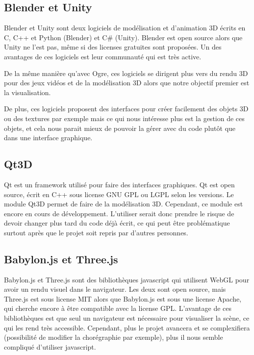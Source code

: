


\subsection{Blender et Unity}

Blender et Unity sont deux logiciels de modélisation et d'animation 3D écrits en C, C++ et Python (Blender) et C\# (Unity). Blender est open source alors que Unity ne l'est pas, même si des licenses gratuites sont proposées. Un des avantages de ces logiciels est leur communauté qui est très active.

De la même manière qu'avec Ogre, ces logiciels se dirigent plus vers du rendu 3D pour des jeux vidéos et de la modélisation 3D alors que notre objectif premier est la visualisation. 

De plus, ces logiciels proposent des interfaces pour créer facilement des objets 3D ou des textures par exemple mais ce qui nous intéresse plus est la gestion de ces objets, et cela nous parait mieux de pouvoir la gérer avec du code plutôt que dans une interface graphique. 
				
\subsection{Qt3D}

Qt est un framework utilisé pour faire des interfaces graphiques. Qt est open source, écrit en C++ sous license GNU GPL ou LGPL selon les versions. Le module Qt3D permet de faire de la modélisation 3D. Cependant, ce module est encore en cours de développement. L'utiliser serait donc prendre le risque de devoir changer plus tard du code déjà écrit, ce qui peut être problématique surtout après que le projet soit repris par d'autres personnes. 

\subsection{Babylon.js et Three.js}

Babylon.js et Three.js sont des bibliothèques javascript qui utilisent WebGL pour avoir un rendu visuel dans le navigateur. Les deux sont open source, mais Three.js est sous license MIT alors que Babylon.js est sous une license Apache, qui cherche encore à être compatible avec la license GPL. L'avantage de ces bibliothèques est que seul un navigateur est nécessaire pour visualiser la scène, ce qui les rend très accessible. Cependant, plus le projet avancera et se complexifiera (possibilité de modifier la chorégraphie par exemple), plus il nous semble compliqué d'utiliser javascript.

